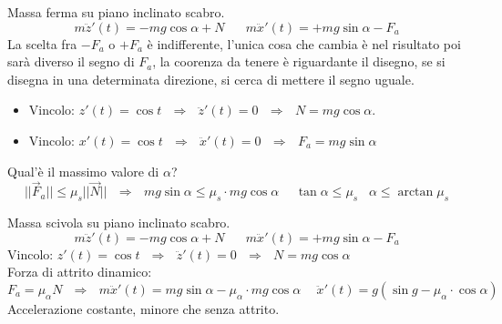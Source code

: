 \begin{example}\label{es-rez-vin-5}
    Massa ferma su piano inclinato scabro.
    $$m\ddot{z}'(t) = -mg\cos\alpha + N \hspace{20pt} m\ddot{x}'(t) = +mg\sin\alpha - F_{a}$$
    La scelta fra $-F_{a}$ o $+F_a$ è indifferente, l'unica cosa che cambia è nel risultato poi sarà diverso il segno di $F_a$, la coorenza da tenere è riguardante il disegno, se si disegna
    in una determinata direzione, si cerca di mettere il segno uguale.
    \begin{itemize}
        \item Vincolo: $z'(t) = \cos t \:\:\:\Rightarrow\:\:\: \ddot{z}'(t) = 0 \:\:\:\Rightarrow\:\:\: N = mg\cos\alpha$.
        \item Vincolo: $x'(t) = \cos t \:\:\:\Rightarrow\:\:\: \ddot{x}'(t) = 0 \:\:\:\Rightarrow\:\:\: F_a = mg\sin\alpha$
    \end{itemize}
    Qual'è il massimo valore di $\alpha$?
    $$||\vec{F}_a|| \leq \mu_s ||\vec{N}|| \:\:\:\Rightarrow\:\:\: mg\sin\alpha \leq \mu_s \cdot mg \cos\alpha \hspace{15pt} \tan\alpha \leq \mu_s \hspace{10pt} \alpha \leq \arctan\mu_s$$
\end{example}

\begin{example}\label{es-rez-vin-6}
    Massa scivola su piano inclinato scabro.
    $$m\ddot{z}'(t) = -mg\cos\alpha + N \hspace{20pt} m\ddot{x}'(t) = +mg\sin\alpha - F_{a}$$
    Vincolo: $z'(t) = \cos t \:\:\:\Rightarrow\:\:\: \ddot{z}'(t) = 0 \:\:\:\Rightarrow\:\:\: N = mg\cos\alpha$\\
    Forza di attrito dinamico: 
    $$F_a = \mu_{\alpha}N \:\:\:\Rightarrow\:\:\: m\ddot{x}'(t) = mg\sin\alpha - \mu_{\alpha} \cdot mg\cos\alpha \hspace{15pt} \ddot{x}'(t) = g(\sin g - \mu_{\alpha} \cdot \cos \alpha)$$
    Accelerazione costante, minore che senza attrito.
\end{example}

